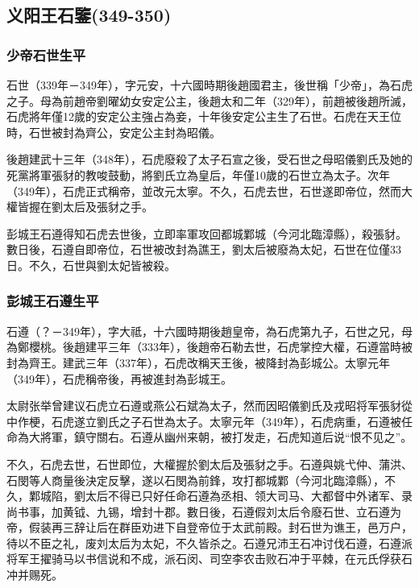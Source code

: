 
\subsection{义阳王石鑒\tiny(349-350)}

\subsubsection{少帝石世生平}

石世（339年－349年），字元安，十六國時期後趙國君主，後世稱「少帝」，為石虎之子。母為前趙帝劉曜幼女安定公主，後趙太和二年（329年），前趙被後趙所滅，石虎將年僅12歲的安定公主強占為妾，十年後安定公主生了石世。石虎在天王位時，石世被封為齊公，安定公主封為昭儀。

後趙建武十三年（348年），石虎廢殺了太子石宣之後，受石世之母昭儀劉氏及她的死黨將軍張豺的教唆鼓動，將劉氏立為皇后，年僅10歲的石世立為太子。次年（349年），石虎正式稱帝，並改元太寧。不久，石虎去世，石世遂即帝位，然而大權皆握在劉太后及張豺之手。

彭城王石遵得知石虎去世後，立即率軍攻回都城鄴城（今河北臨漳縣），殺張豺。數日後，石遵自即帝位，石世被改封為譙王，劉太后被廢為太妃，石世在位僅33日。不久，石世與劉太妃皆被殺。

\subsubsection{彭城王石遵生平}

石遵（？－349年），字大祗，十六國時期後趙皇帝，為石虎第九子，石世之兄，母為鄭櫻桃。後趙建平三年（333年），後趙帝石勒去世，石虎掌控大權，石遵當時被封為齊王。建武三年（337年），石虎改稱天王後，被降封為彭城公。太寧元年（349年），石虎稱帝後，再被進封為彭城王。

太尉张举曾建议石虎立石遵或燕公石斌為太子，然而因昭儀劉氏及戎昭将军張豺從中作梗，石虎遂立劉氏之子石世為太子。太寧元年（349年），石虎病重，石遵被任命為大將軍，鎮守關右。石遵从幽州来朝，被打发走，石虎知道后说“恨不见之”。

不久，石虎去世，石世即位，大權握於劉太后及張豺之手。石遵與姚弋仲、蒲洪、石閔等人商量後決定反擊，遂以石閔為前鋒，攻打都城鄴（今河北臨漳縣），不久，鄴城陷，劉太后不得已只好任命石遵為丞相、领大司马、大都督中外诸军、录尚书事，加黄钺、九锡，增封十郡。數日後，石遵假刘太后令廢石世、立石遵为帝，假装再三辞让后在群臣劝进下自登帝位于太武前殿。封石世为谯王，邑万户，待以不臣之礼，废刘太后为太妃，不久皆杀之。石遵兄沛王石冲讨伐石遵，石遵派将军王擢骑马以书信说和不成，派石闵、司空李农击败石冲于平棘，在元氏俘获石冲并赐死。

